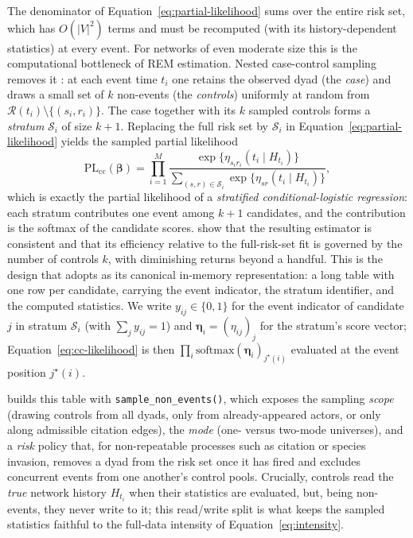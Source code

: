 The denominator of Equation~\eqref{eq:partial-likelihood} sums over the
entire risk set, which has $O(|V|^2)$ terms and must be recomputed (with
its history-dependent statistics) at every event. For networks of even
moderate size this is the computational bottleneck of REM estimation.
Nested case-control sampling removes it \citep{lerner2020}: at each event
time $t_i$ one retains the observed dyad (the \emph{case}) and draws a
small set of $k$ non-events (the \emph{controls}) uniformly at random from
$\mathcal{R}(t_i) \setminus \{(s_i, r_i)\}$. The case together with its
$k$ sampled controls forms a \emph{stratum} $\mathcal{S}_i$ of size
$k + 1$. Replacing the full risk set by $\mathcal{S}_i$ in
Equation~\eqref{eq:partial-likelihood} yields the sampled partial
likelihood
\begin{equation}
\mathrm{PL}_{\mathrm{cc}}(\boldsymbol{\beta})
  = \prod_{i=1}^{M}
    \frac{\exp\!\bigl\{\eta_{s_i r_i}(t_i \mid H_{t_i})\bigr\}}
         {\sum_{(s,r) \in \mathcal{S}_i}
            \exp\!\bigl\{\eta_{sr}(t_i \mid H_{t_i})\bigr\}},
\label{eq:cc-likelihood}
\end{equation}
which is exactly the partial likelihood of a \emph{stratified
conditional-logistic regression}: each stratum contributes one event
among $k+1$ candidates, and the contribution is the softmax of the
candidate scores. \citet{lerner2020} show that the resulting estimator is
consistent and that its efficiency relative to the full-risk-set fit is
governed by the number of controls $k$, with diminishing returns beyond a
handful. This is the design that  adopts as its canonical
in-memory representation: a long table with one row per candidate,
carrying the event indicator, the stratum identifier, and the computed
statistics. We write $y_{ij} \in \{0,1\}$ for the event indicator of
candidate $j$ in stratum $\mathcal{S}_i$ (with $\sum_j y_{ij} = 1$) and
$\boldsymbol{\eta}_i = (\eta_{ij})_j$ for the stratum's score vector;
Equation~\eqref{eq:cc-likelihood} is then $\prod_i
\mathrm{softmax}(\boldsymbol{\eta}_i)_{j^\star(i)}$ evaluated at the event
position $j^\star(i)$.

 builds this table with \texttt{sample\_non\_events()}, which
exposes the sampling \emph{scope} (drawing controls from all dyads, only
from already-appeared actors, or only along admissible citation edges),
the \emph{mode} (one- versus two-mode universes), and a \emph{risk}
policy that, for non-repeatable processes such as citation or species
invasion, removes a dyad from the risk set once it has fired and excludes
concurrent events from one another's control pools. Crucially, controls
read the \emph{true} network history $H_{t_i}$ when their statistics are
evaluated, but, being non-events, they never write to it; this read/write
split is what keeps the sampled statistics faithful to the full-data
intensity of Equation~\eqref{eq:intensity}.

